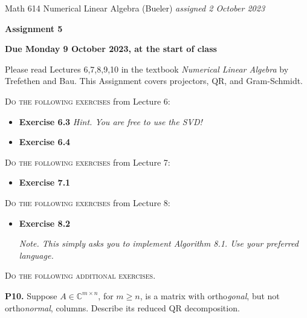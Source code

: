 \documentclass[12pt]{amsart}
\newcommand{\CC}{\mathbb{C}}
\newcommand{\prob}[1]{\bigskip\noindent\textbf{#1.}\quad }
\begin{document}
\scriptsize \noindent Math 614 Numerical Linear Algebra (Bueler) \hfill \emph{assigned 2 October 2023}
\normalsize\medskip

\Large\centerline{\textbf{Assignment 5}}
\large
\medskip

\centerline{\textbf{Due Monday 9 October 2023, at the start of class}}
\medskip
\normalsize

\thispagestyle{empty}

\bigskip
\noindent Please read Lectures 6,7,8,9,10 in the textbook \emph{Numerical Linear Algebra} by Trefethen and Bau.  This Assignment covers projectors, QR, and Gram-Schmidt.

\bigskip
\noindent \textsc{Do the following exercises} from Lecture 6:

\begin{itemize}
\item \textbf{Exercise 6.3} \qquad \emph{Hint. You are free to use the SVD!}
\item \textbf{Exercise 6.4}
\end{itemize}

\bigskip
\noindent \textsc{Do the following exercises} from Lecture 7:

\begin{itemize}
\item \textbf{Exercise 7.1}
\end{itemize}

\bigskip
\noindent \textsc{Do the following exercises} from Lecture 8:

\begin{itemize}
\item \textbf{Exercise 8.2} \qquad \begin{minipage}[t]{0.68\textwidth}
\emph{Note. This simply asks you to implement Algorithm 8.1.  Use your preferred language.}
\end{minipage}
\end{itemize}


\bigskip
\noindent \textsc{Do the following additional exercises.}

\prob{P10}  Suppose $A\in \CC^{m\times n}$, for $m\ge n$, is a matrix with ortho\emph{gonal}, but not ortho\emph{normal}, columns.  Describe its reduced QR decomposition.
\end{document}

